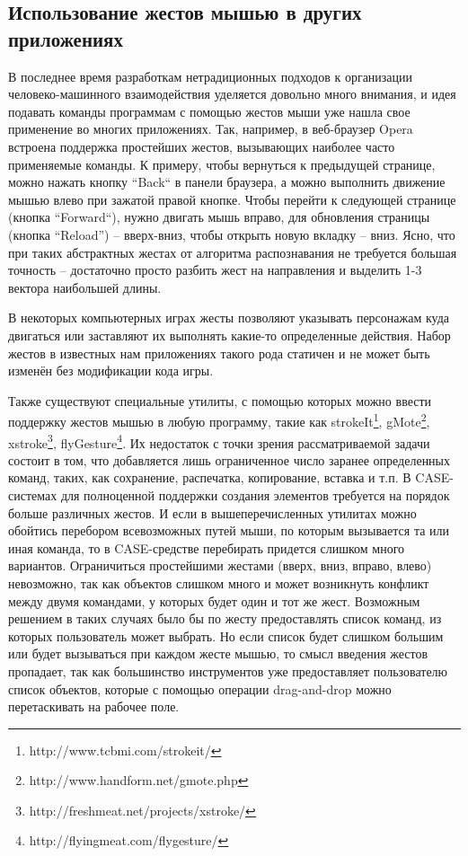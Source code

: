 \documentclass[a5paper]{article}
\begin{document}
\subsection{Использование жестов мышью в других приложениях}

В последнее время разработкам нетрадиционных подходов к организации человеко-машинного взаимодействия уделяется довольно много внимания, и идея подавать команды программам с помощью жестов мыши уже нашла свое применение во многих приложениях. Так, например, в веб-браузер Opera встроена поддержка простейших жестов, вызывающих наиболее часто применяемые команды. К примеру, чтобы вернуться к предыдущей странице, можно нажать кнопку ``Back`` в панели браузера, а можно выполнить движение мышью влево при зажатой правой кнопке. Чтобы перейти к следующей странице (кнопка ``Forward``), нужно двигать мышь вправо, для обновления страницы (кнопка ``Reload'') -- вверх-вниз, чтобы открыть новую вкладку -- вниз. Ясно, что при таких абстрактных жестах от алгоритма распознавания не требуется большая точность -- достаточно просто разбить жест на направления и выделить 1-3 вектора наибольшей длины.

В некоторых компьютерных играх жесты позволяют указывать персонажам куда двигаться или заставляют их выполнять какие-то определенные действия. Набор жестов в известных нам приложениях такого рода статичен и не может быть изменён без модификации кода игры.

Также существуют специальные утилиты, с помощью которых можно ввести поддержку жестов мышью в любую программу, такие как strokeIt\footnote{http://www.tcbmi.com/strokeit/}, gMote\footnote{http://www.handform.net/gmote.php}, xstroke\footnote{http://freshmeat.net/projects/xstroke/}, flyGesture\footnote{http://flyingmeat.com/flygesture/}. Их недостаток с точки зрения рассматриваемой задачи состоит в том, что добавляется лишь ограниченное число заранее определенных команд, таких, как сохранение, распечатка, копирование, вставка и т.п. В CASE-системах для полноценной поддержки создания элементов требуется на порядок больше различных жестов. И если в вышеперечисленных утилитах можно обойтись перебором всевозможных путей мыши, по которым вызывается та или иная команда, то в CASE-средстве перебирать придется слишком много вариантов. Ограничиться простейшими жестами (вверх, вниз, вправо, влево) невозможно, так как объектов слишком много и может возникнуть конфликт между двумя командами, у которых будет один и тот же жест. Возможным решением в таких случаях было бы по жесту предоставлять список команд, из которых пользователь может выбрать. Но если список будет слишком большим или будет вызываться при каждом жесте мышью, то смысл введения жестов пропадает, так как большинство инструментов уже предоставляет пользователю список объектов, которые с помощью операции drag-and-drop можно перетаскивать на рабочее поле.
\end{document}

